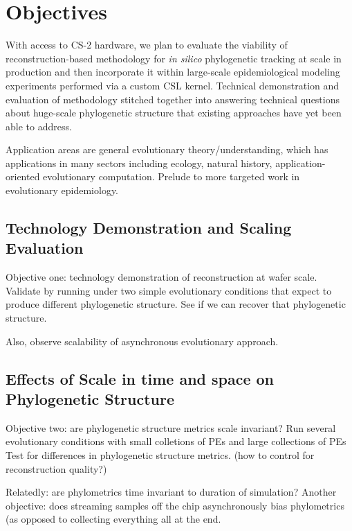 \section{Objectives} \label{sec:objectives}

With access to CS-2 hardware, we plan to evaluate the viability of reconstruction-based methodology for \textit{in silico} phylogenetic tracking at scale in production and then incorporate it within large-scale epidemiological modeling experiments performed via a custom CSL kernel.
Technical demonstration and evaluation of methodology stitched together into answering technical questions about huge-scale phylogenetic structure that existing approaches have yet been able to address.

Application areas are general evolutionary theory/understanding, which has applications in many sectors including ecology, natural history, application-oriented evolutionary computation.
Prelude to more targeted work in evolutionary epidemiology.

\subsection{Technology Demonstration and Scaling Evaluation}
Objective one: technology demonstration of reconstruction at wafer scale.
Validate by running under two simple evolutionary conditions that expect to produce different phylogenetic structure.
See if we can recover that phylogenetic structure.

Also, observe scalability of asynchronous evolutionary approach.

\subsection{Effects of Scale in time and space on Phylogenetic Structure}
Objective two: are phylogenetic structure metrics scale invariant?
Run several evolutionary conditions with small colletions of PEs and large collections of PEs
Test for differences in phylogenetic structure metrics.
(how to control for reconstruction quality?)

Relatedly: are phylometrics time invariant to duration of simulation?
Another objective: does streaming samples off the chip asynchronously bias phylometrics (as opposed to collecting everything all at the end.


